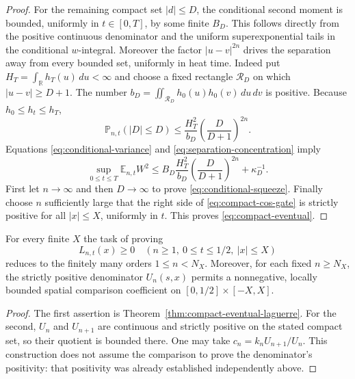 \begin{proof}
For the remaining compact set $|d|\le D$,
the conditional second moment is bounded,
uniformly in $t\in[0,T]$, by some finite
$B_D$. This follows directly from the
positive continuous denominator and the
uniform superexponential tails in the
conditional $w$-integral.
Moreover the factor $|u-v|^{2n}$ drives
the separation away from every bounded
set, uniformly in heat time.
Indeed put
$H_T=\int_{\mathbb R}h_T(u)\,du<\infty$
and choose a fixed rectangle
$\mathcal R_D$ on which $|u-v|\ge D+1$.
The number
$b_D=\iint_{\mathcal R_D}h_0(u)h_0(v)\,du\,dv$
is positive. Because $h_0\le h_t\le h_T$,
\begin{equation}
\mathbb P_{n,t}(|D|\le D)
\le \frac{H_T^2}{b_D}
\left(\frac{D}{D+1}\right)^{2n}.
\label{eq:separation-concentration}
\end{equation}
Equations \eqref{eq:conditional-variance} and
\eqref{eq:separation-concentration} imply
\begin{equation}
\sup_{0\le t\le T}\mathbb E_{n,t}W^2
\le B_D\frac{H_T^2}{b_D}
\left(\frac{D}{D+1}\right)^{2n}
+\kappa_D^{-1}.
\label{eq:highorder-second-moment}
\end{equation}
First let $n\to\infty$ and then
$D\to\infty$ to prove
\eqref{eq:conditional-squeeze}.
Finally choose $n$ sufficiently large
that the right side of
\eqref{eq:compact-cos-gate} is strictly
positive for all $|x|\le X$, uniformly
in $t$. This proves
\eqref{eq:compact-eventual}.
\end{proof}

\begin{corollary}
\label{cor:compact-finite-order}
For every finite $X$ the task of proving
\[
L_{n,t}(x)\ge0\quad
(n\ge1,\ 0\le t\le1/2,\ |x|\le X)
\]
reduces to the finitely many orders
$1\le n<N_X$. Moreover, for each
fixed $n\ge N_X$, the strictly positive
denominator $U_n(s,x)$ permits a
nonnegative, locally bounded spatial
comparison coefficient on
$[0,1/2]\times[-X,X]$.
\end{corollary}
\begin{proof}
The first assertion is
Theorem~\ref{thm:compact-eventual-laguerre}.
For the second, $U_n$ and $U_{n+1}$
are continuous and strictly positive on
the stated compact set, so their quotient
is bounded there. One may take
$c_n=k_nU_{n+1}/U_n$.
This construction does not assume the
comparison to prove the denominator's
positivity: that positivity was already
established independently above.
\end{proof}

